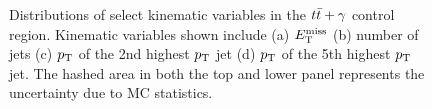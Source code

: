 \begin{figure}[h!]
\begin{center}
\caption[~Distributions of select kinematic variables in the $\ttbar+\gamma$ control region]{ Distributions of select kinematic variables in the $\ttbar+\gamma$ control region. Kinematic variables shown include (a) $E_{\mathrm{T}}^{\mathrm{miss}}$ (b) number of jets (c) $p_{\mathrm{T}}$ of the 2nd highest $p_{\mathrm{T}}$ jet (d) $p_{\mathrm{T}}$ of the 5th highest $p_{\mathrm{T}}$ jet. The hashed area in both the top and lower panel represents the uncertainty due to MC statistics.}
\label{fig:ttgamma}
\end{center}
\end{figure}





